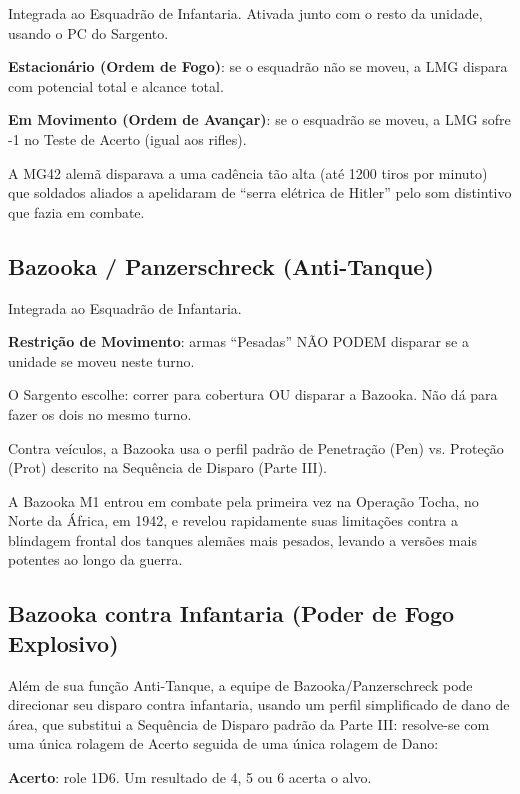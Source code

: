 Integrada ao Esquadrão de Infantaria. Ativada junto com o resto da unidade, usando o PC do Sargento.

\textbf{Estacionário (Ordem de Fogo)}: se o esquadrão não se moveu, a LMG dispara com potencial total e alcance total.

\textbf{Em Movimento (Ordem de Avançar)}: se o esquadrão se moveu, a LMG sofre -1 no Teste de Acerto (igual aos rifles).

\begin{nota}
A MG42 alemã disparava a uma cadência tão alta (até 1200 tiros por minuto) que soldados aliados a apelidaram de ``serra elétrica de Hitler'' pelo som distintivo que fazia em combate.
\end{nota}

\subsection{Bazooka / Panzerschreck (Anti-Tanque)}

Integrada ao Esquadrão de Infantaria.

\textbf{Restrição de Movimento}: armas ``Pesadas'' NÃO PODEM disparar se a unidade se moveu neste turno.

O Sargento escolhe: correr para cobertura OU disparar a Bazooka. Não dá para fazer os dois no mesmo turno.

Contra veículos, a Bazooka usa o perfil padrão de Penetração (Pen) vs. Proteção (Prot) descrito na Sequência de Disparo (Parte III).

\begin{nota}
A Bazooka M1 entrou em combate pela primeira vez na Operação Tocha, no Norte da África, em 1942, e revelou rapidamente suas limitações contra a blindagem frontal dos tanques alemães mais pesados, levando a versões mais potentes ao longo da guerra.
\end{nota}

\subsection{Bazooka contra Infantaria (Poder de Fogo Explosivo)}

Além de sua função Anti-Tanque, a equipe de Bazooka/Panzerschreck pode direcionar seu disparo contra infantaria, usando um perfil simplificado de dano de área, que substitui a Sequência de Disparo padrão da Parte III: resolve-se com uma única rolagem de Acerto seguida de uma única rolagem de Dano:

\textbf{Acerto}: role 1D6. Um resultado de 4, 5 ou 6 acerta o alvo.

